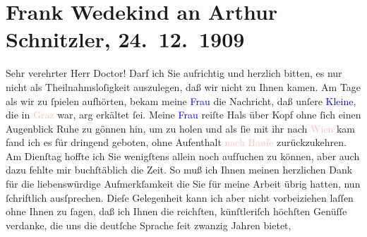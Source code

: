 

               \section[Frank Wedekind an Arthur Schnitzler, 24. 12. 1909]{ Frank Wedekind an Arthur Schnitzler, 24. 12. 1909}\nopagebreak{}\rehead{ }\normalsize\beginnumbering{} \toendnotes[C]{\smallbreak\pagebreak[2]} 
\toendnotes[C]{\smallbreak}\pstart{}{\pb}Sehr verehrter Herr Doctor!\pend\pstart
           Darf ich Sie aufrichtig und herzlich bitten, es nur nicht als Theilnahmsloſigkeit
               auszulegen, daß wir nicht zu Ihnen kamen. Am Tage als wir zu ſpielen aufhörten, bekam
               meine \textcolor{blue}{Frau}{} die Nachricht, daß
               unſere \textcolor{blue}{Kleine}{}, die in \textcolor{pink}{Graz}{}\ledrightnote{\textcolor{pink}{Graz}} war, arg erkältet ſei. {\pb}Meine \textcolor{blue}{Frau}{} reiſte Hals über Kopf ohne ſich einen Augenblick Ruhe
               zu gönnen hin, um \label{T_L01909_1v}\label{T_L01909_1h} zu holen
               und als ſie mit ihr nach \textcolor{pink}{Wien}{}\ledrightnote{\textcolor{pink}{Wien}} kam fand ich es für
               dringend geboten, ohne Aufenthalt \textcolor{pink}{nach Hauſe}{} zurückzukehren. Am Dienſtag hoffte ich Sie
               wenigſtens allein noch aufſuchen zu können, aber auch dazu fehlte mir buchſtäblich
               die Zeit. So muß ich Ihnen meinen herzlichen Dank für die liebenswürdige
               Aufmerkſamkeit {\pb}die Sie für meine Arbeit
               übrig hatten, nun ſchriftlich ausſprechen. Dieſe Gelegenheit kann ich aber nicht
               vorbeiziehen laſſen ohne Ihnen zu ſagen, daß ich Ihnen die reichſten, künſtleriſch
               höchſten Genüſſe verdanke, die uns die deutſche Sprache ſeit zwanzig Jahren bietet,
